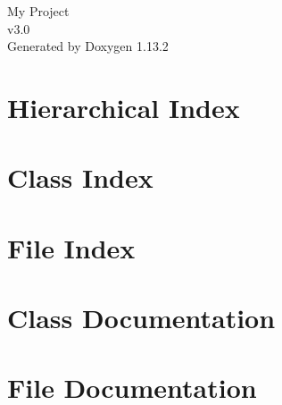 \documentclass[twoside]{book}
\newcommand{\+}{\discretionary{\mbox{\scriptsize$\hookleftarrow$}}{}{}}
\newcommand{\clearemptydoublepage}{%
    \newpage{\pagestyle{empty}\cleardoublepage}%
  }
\begin{document}
  \raggedbottom
    \hypersetup{pageanchor=false,
                bookmarksnumbered=true,
                pdfencoding=unicode
               }
  \begin{titlepage}
  \vspace*{7cm}
  \begin{center}%
  {\Large My Project}\\
  [1ex]\large v3.\+0 \\
  \vspace*{1cm}
  {\large Generated by Doxygen 1.13.2}\\
  \end{center}
  \end{titlepage}
  \clearemptydoublepage
  \tableofcontents
  \clearemptydoublepage
  \hypersetup{pageanchor=true}

\chapter{Hierarchical Index}

\chapter{Class Index}

\chapter{File Index}

\chapter{Class Documentation}



\chapter{File Documentation}





  \backmatter
  \newpage
  \clearemptydoublepage
  \printindex
\end{document}
